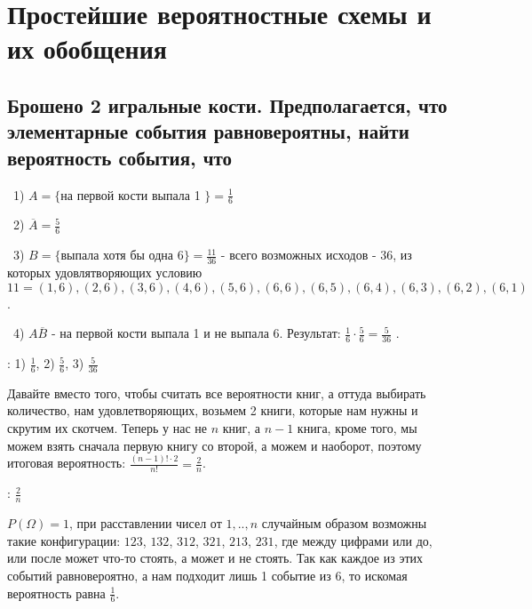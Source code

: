 \section{Простейшие вероятностные схемы и их обобщения}

\subsection{Брошено 2 игральные кости. Предполагается, что элементарные события равновероятны,
найти вероятность события, что}

\noindent~1) $A = \{$на первой кости выпала 1 $\} = \frac{1}{6}$ 

\medskip
\noindent~2) $\overline{A} = \frac{5}{6}$ 

\medskip
\noindent~3) $B = \{$выпала хотя бы одна 6$\} = \frac{11}{36}$ - всего возможных исходов - $36$, из 
которых удовлятворяющих условию $11 = (1,6), (2,6), (3,6), (4,6), (5,6), (6,6), (6,5), (6,4),
(6,3), (6,2), (6,1)$.

\medskip
\noindent~4) $A \overline{B}$ - на первой кости выпала 1 и не выпала 6. Результат: $\frac{1}{6} \cdot  
\frac{5}{6} = \frac{5}{36}$ . 

\bigskip
{}: 1) $\frac{1}{6}$, 2) $\frac{5}{6}$, 3) $\frac{5}{36}$



\noindent Давайте вместо того, чтобы считать все вероятности книг, а оттуда выбирать количество, 
нам удовлетворяющих, возьмем 2 книги, которые нам нужны и скрутим их скотчем. Теперь у нас не 
$n$ книг, а $n - 1$ книга, кроме того, мы можем взять сначала первую книгу со второй, а можем 
и наоборот, поэтому итоговая вероятность: $\frac{(n-1)! \cdot 2}{n!} = \frac{2}{n}$.

\bigskip
{}: $\frac{2}{n}$


\noindent $P(\Omega) = 1$, при расставлении чисел от $1,..,n$ случайным образом возможны такие 
конфигурации: $123$, $132$, $312$, $321$, $213$, $231$, где между цифрами или до, или после может что-то стоять,
а может и не стоять. Так как каждое из этих событий равновероятно, а нам подходит лишь 1 событие
из 6, то искомая вероятность равна $\frac{1}{6}$.

